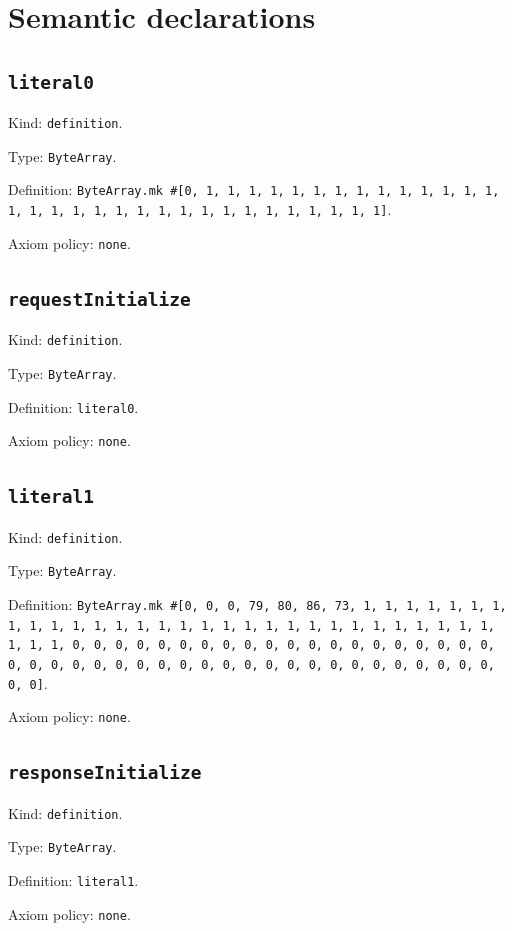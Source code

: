 \documentclass[11pt]{article}
\begin{document}
\section*{Semantic declarations}
\subsection*{\texttt{literal0}}
\noindent Kind: \texttt{definition}.\par
\noindent Type: \texttt{ByteArray}.\par
\noindent Definition: \texttt{ByteArray.mk \#[0, 1, 1, 1, 1, 1, 1, 1, 1, 1, 1, 1, 1, 1, 1, 1, 1, 1, 1, 1, 1, 1, 1, 1, 1, 1, 1, 1, 1, 1, 1, 1, 1]}.\par
\noindent Axiom policy: \texttt{none}.\par
\subsection*{\texttt{requestInitialize}}
\noindent Kind: \texttt{definition}.\par
\noindent Type: \texttt{ByteArray}.\par
\noindent Definition: \texttt{literal0}.\par
\noindent Axiom policy: \texttt{none}.\par
\subsection*{\texttt{literal1}}
\noindent Kind: \texttt{definition}.\par
\noindent Type: \texttt{ByteArray}.\par
\noindent Definition: \texttt{ByteArray.mk \#[0, 0, 0, 79, 80, 86, 73, 1, 1, 1, 1, 1, 1, 1, 1, 1, 1, 1, 1, 1, 1, 1, 1, 1, 1, 1, 1, 1, 1, 1, 1, 1, 1, 1, 1, 1, 1, 1, 1, 1, 0, 0, 0, 0, 0, 0, 0, 0, 0, 0, 0, 0, 0, 0, 0, 0, 0, 0, 0, 0, 0, 0, 0, 0, 0, 0, 0, 0, 0, 0, 0, 0, 0, 0, 0, 0, 0, 0, 0, 0, 0, 0, 0, 0, 0]}.\par
\noindent Axiom policy: \texttt{none}.\par
\subsection*{\texttt{responseInitialize}}
\noindent Kind: \texttt{definition}.\par
\noindent Type: \texttt{ByteArray}.\par
\noindent Definition: \texttt{literal1}.\par
\noindent Axiom policy: \texttt{none}.\par
\end{document}
